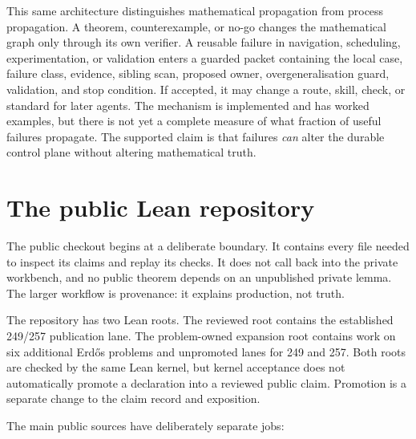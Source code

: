 \documentclass[10pt]{article}
\begin{document}
This same architecture distinguishes mathematical propagation from process
propagation. A theorem, counterexample, or no-go changes the mathematical graph
only through its own verifier. A reusable failure in navigation, scheduling,
experimentation, or validation enters a guarded packet containing the local
case, failure class, evidence, sibling scan, proposed owner, overgeneralisation
guard, validation, and stop condition. If accepted, it may change a route,
skill, check, or standard for later agents. The mechanism is implemented and
has worked examples, but there is not yet a complete measure of what fraction
of useful failures propagate. The supported claim is that failures \emph{can}
alter the durable control plane without altering mathematical truth.

\section{The public Lean repository}\label{sec:public}

The public checkout begins at a deliberate boundary. It contains every file
needed to inspect its claims and replay its checks. It does not call back into
the private workbench, and no public theorem depends on an unpublished private
lemma. The larger workflow is provenance: it explains production, not truth.

The repository has two Lean roots. The reviewed root contains the established
249/257 publication lane. The problem-owned expansion root contains work on six
additional Erd\H{o}s problems and unpromoted lanes for 249 and 257. Both roots
are checked by the same Lean kernel, but kernel acceptance does not automatically
promote a declaration into a reviewed public claim. Promotion is a separate
change to the claim record and exposition.

The main public sources have deliberately separate jobs:
\end{document}
